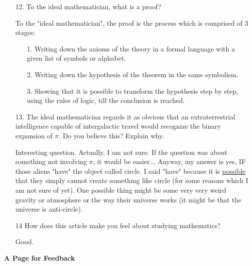 \documentclass[12pt, a4paper]{article}                  %
\begin{document}
\begin{enumerate}
\item[12.]
To the ideal mathematician, what is a proof?

To the "ideal mathematician", the proof is the process which is comprised of 3 stages:
\begin{enumerate}
\item[1.]
Writing down the axioms of the theory in a formal language with a given list of symbols or alphabet.
\item[2.]
Writing down the hypothesis of the theorem in the same symbolism.
\item[3.]
Showing that it is possible to transform the hypothesis step by step, using the rules of logic, till the conclusion is reached.
\end{enumerate}

\item[13.]
The ideal mathematician regards it as obvious that an extraterrestrial intelligence
capable of intergalactic travel would recognize the binary expansion of $\pi$.
Do you believe this? Explain why.

Interesting question. Actually, I am not sure. If the question was about something not
involving $\pi$, it would be easier... Anyway, my answer is yes, IF those aliens
"have" the object called circle. I said "have" because it is \underline{possible} that they
simply cannot create something like circle (for some reasons which I am not sure of yet).
One possible thing might be some very very weird gravity or atmosphere or the way their
universe works (it might be that the universe is anti-circle). 

\item[14]
How does this article make you feel about studying mathematics?

Good.
\end{enumerate}

\newpage
\begin{center}
\LARGE{\textbf{A Page for Feedback}}
\end{center}
\end{document}
